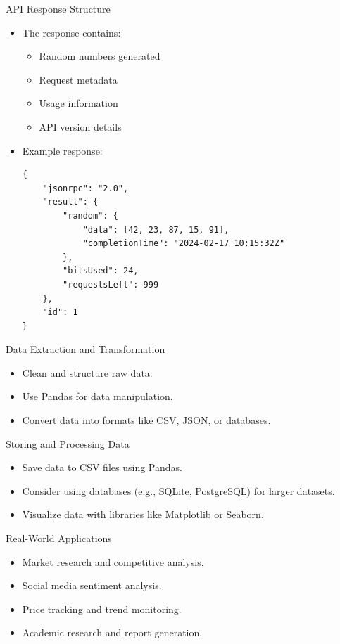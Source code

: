 \documentclass[10pt]{beamer}
\begin{document}
\begin{frame}[fragile]{API Response Structure}
    \begin{itemize}
        \item The response contains:
        \begin{itemize}
            \item Random numbers generated
            \item Request metadata
            \item Usage information
            \item API version details
        \end{itemize}
        \item Example response:
        \begin{verbatim}
{
    "jsonrpc": "2.0",
    "result": {
        "random": {
            "data": [42, 23, 87, 15, 91],
            "completionTime": "2024-02-17 10:15:32Z"
        },
        "bitsUsed": 24,
        "requestsLeft": 999
    },
    "id": 1
}
        \end{verbatim}
    \end{itemize}
\end{frame}

\begin{frame}[fragile]{Data Extraction and Transformation}
    \begin{itemize}
        \item Clean and structure raw data.
        \item Use Pandas for data manipulation.
        \item Convert data into formats like CSV, JSON, or databases.
    \end{itemize}
\end{frame}

\begin{frame}[fragile]{Storing and Processing Data}
    \begin{itemize}
        \item Save data to CSV files using Pandas.
        \item Consider using databases (e.g., SQLite, PostgreSQL) for larger datasets.
        \item Visualize data with libraries like Matplotlib or Seaborn.
    \end{itemize}
\end{frame}

\begin{frame}[fragile]{Real-World Applications}
    \begin{itemize}
        \item Market research and competitive analysis.
        \item Social media sentiment analysis.
        \item Price tracking and trend monitoring.
        \item Academic research and report generation.
    \end{itemize}
\end{frame}
\end{document}
